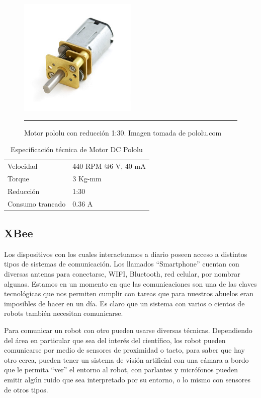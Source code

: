\begin{figure}[htbp]
	\centering
		\includegraphics[width=0.5\textwidth]{./Figures/MODI/Motorpololu.jpg}
		\rule{35em}{0.5pt}
	\caption[MotorDC]{Motor pololu con reducción 1:30. Imagen tomada de pololu.com}
	\label{fig:MotorDC}
\end{figure}

\begin{table}
    \begin{tabular}{l|l}
    Velocidad &  440 RPM @6 V, 40 mA\\
    Torque                & 3 Kg-mm  \\
    Reducción             & 1:30     \\
    Consumo trancado      & 0.36 A   \\
    \end{tabular}
        \caption[Motor]{Especificación técnica de Motor DC Pololu}
	\label{table:Motor}
\end{table}

\subsection{XBee}

Los dispositivos con los cuales interactuamos a diario poseen acceso a distintos tipos de sistemas de comunicación. Los llamados “Smartphone” cuentan con diversas antenas para conectarse, WIFI, Bluetooth, red celular,  por nombrar algunas. Estamos en un momento en que las comunicaciones son una de las claves tecnológicas que nos permiten cumplir con tareas que para nuestros abuelos eran imposibles de hacer en un día. Es claro que un sistema con varios o cientos de robots también necesitan comunicarse. 

Para comunicar un robot con otro pueden usarse diversas técnicas. Dependiendo del área en particular que sea del interés del científico, los robot pueden comunicarse por medio de sensores de proximidad o tacto, para saber que hay otro cerca, pueden tener un sistema de visión artificial con una cámara a bordo que le permita “ver” el entorno al robot, con parlantes y micrófonos pueden emitir algún ruido que sea interpretado por su entorno, o lo mismo con sensores de otros tipos.

